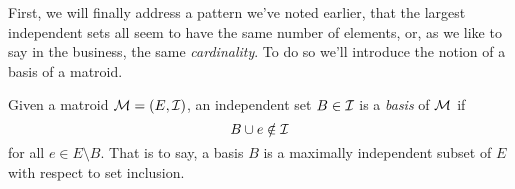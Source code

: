 \documentclass[12pt,oneside]{../../sfsuthesis}
\begin{document}
First, we will finally address a pattern we've noted earlier, that the largest independent sets all seem to have the same number of elements, or, as we like to say in the business, the same \emph{cardinality}.
To do so we'll introduce the notion of a basis of a matroid.
\begin{definition}[Basis]\th\label{def:basis}
    Given a matroid \( \mathcal{M} = (E, \mathcal{I}) \), an independent set \( B \in \mathcal{I} \) is a \emph{basis} of \( \mathcal{M} \) if
    \[
        B \cup e \notin \mathcal{I}
    \]
    for all \( e \in E \setminus B \).
    That is to say, a basis \( B \) is a maximally independent subset of \( E \) with respect to set inclusion.
\end{definition}
\begin{figure}[H]
    \centering
    \begin{subfigure}[t]{.54\textwidth}
        \centering
\end{subfigure}
\end{figure}
\end{document}
